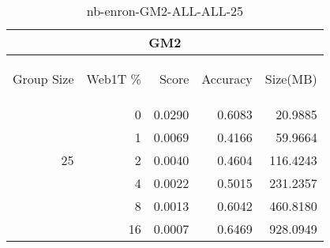 \begin{center}
\begin{table}[htbp]
\begin{tabular}{ | r | r | r | r | r |}
\hline
\multicolumn{5}{|c|}{GM2}\\
\hline
\begin{sideways}Group Size\end{sideways} & \begin{sideways}Web1T \%\end{sideways} & \begin{sideways}Score\end{sideways} & \begin{sideways}Accuracy\end{sideways} & \begin{sideways}Size(MB)\end{sideways}\\
\hline
\multirow{5}{*}{25}
 & 0 & 0.0290 & 0.6083 & 20.9885\\ \cline{2-5}
 & 1 & 0.0069 & 0.4166 & 59.9664\\ \cline{2-5}
 & 2 & 0.0040 & 0.4604 & 116.4243\\ \cline{2-5}
 & 4 & 0.0022 & 0.5015 & 231.2357\\ \cline{2-5}
 & 8 & 0.0013 & 0.6042 & 460.8180\\ \cline{2-5}
 & 16 & 0.0007 & 0.6469 & 928.0949\\ \cline{2-5}
\hline
\end{tabular}
\caption{nb-enron-GM2-ALL-ALL-25}
\label{table:nb-enron-GM2-ALL-ALL-25}
\end{table}
\end{center}


